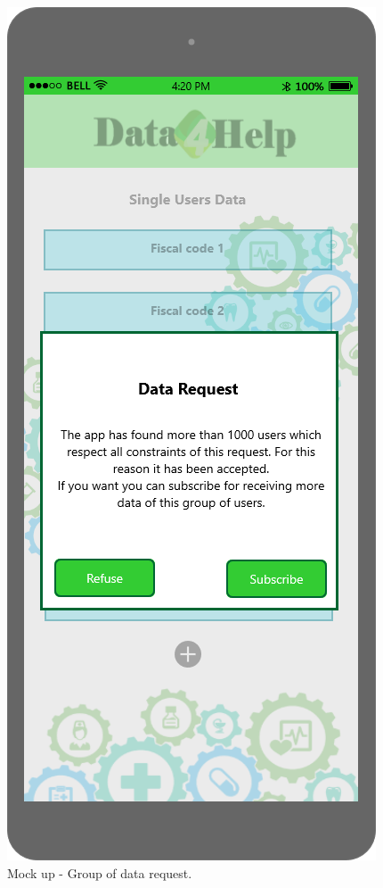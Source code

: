 \begin{figure}[h!]
\begin{minipage}[b]{0.25\textwidth}
    		\caption{Mock up - Group of data request.}
	\end{minipage}
	\hfill
	\begin{minipage}[b]{0.25\textwidth}
    		\includegraphics[width=\textwidth]{./pictures/group_accept.png}

\end{minipage}
\end{figure}
